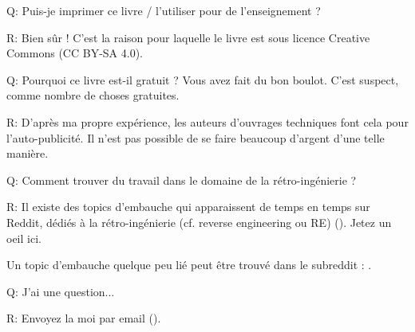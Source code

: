\par Q: Puis-je imprimer ce livre / l'utiliser pour de l'enseignement ?
\par R: Bien sûr ! C'est la raison pour laquelle le livre est sous licence Creative Commons (CC BY-SA 4.0).

\par Q: Pourquoi ce livre est-il gratuit ? Vous avez fait du bon boulot. C'est suspect, comme nombre de choses gratuites.
\par R: D'après ma propre expérience, les auteurs d'ouvrages techniques font cela pour l'auto-publicité. Il n'est pas possible de se faire beaucoup d'argent d'une telle manière.

\par Q: Comment trouver du travail dans le domaine de la rétro-ingénierie ?
\par R: Il existe des topics d'embauche qui apparaissent de temps en temps sur Reddit, dédiés à la rétro-ingénierie (cf. reverse engineering ou RE)\FNURLREDDIT{}
(\RedditHiringThread{}).
Jetez un oeil ici.

Un topic d'embauche quelque peu lié peut être trouvé dans le subreddit : \NetsecHiringThread{}.

\par Q: J'ai une question...
\par R: Envoyez la moi par email (\EMAIL).

